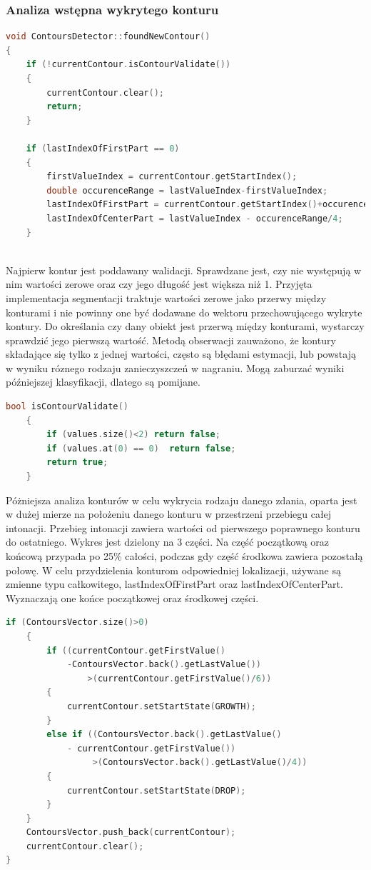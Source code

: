\documentclass[a4paper,12 pt]{article}
\begin{document}
\subsubsection{Analiza wstępna wykrytego konturu}
\begin{lstlisting}[caption={Funkcja zajmująca się analizą wstępną wykrytego konturu},label={lst:label},language=C++]
void ContoursDetector::foundNewContour()
{
    if (!currentContour.isContourValidate())
    {
        currentContour.clear();
        return;
    }
    
    if (lastIndexOfFirstPart == 0)
    {
        firstValueIndex = currentContour.getStartIndex();
        double occurenceRange = lastValueIndex-firstValueIndex;
        lastIndexOfFirstPart = currentContour.getStartIndex()+occurenceRange/4;
        lastIndexOfCenterPart = lastValueIndex - occurenceRange/4;
    }
                
\end{lstlisting}
Najpierw kontur jest poddawany walidacji. Sprawdzane jest, czy nie występują w nim wartości zerowe oraz czy jego długość jest większa niż 1. Przyjęta implementacja segmentacji traktuje wartości zerowe jako przerwy między konturami i nie powinny one być dodawane do wektoru przechowującego wykryte kontury. Do określania czy dany obiekt jest przerwą między konturami, wystarczy sprawdzić jego pierwszą wartość.
Metodą obserwacji zauważono, że kontury składające się tylko z jednej wartości, często są błędami estymacji, lub powstają w wyniku róznego rodzaju zanieczyszczeń w nagraniu. Mogą zaburzać wyniki późniejszej klasyfikacji, dlatego są pomijane.
\begin{lstlisting}[caption={Funkcja dokonująca walidacji konturu},label={lst:label},language=C++]
    bool isContourValidate()
    {
        if (values.size()<2) return false;
        if (values.at(0) == 0)  return false;
        return true;
    }
\end{lstlisting}
Póżniejsza analiza konturów w celu wykrycia rodzaju danego zdania, oparta jest w dużej mierze na położeniu danego konturu w przestrzeni przebiegu całej intonacji. Przebieg intonacji zawiera wartości od pierwszego poprawnego konturu do ostatniego. Wykres jest dzielony na 3 części. Na część początkową oraz końcową przypada po 25\% całości, podczas gdy część środkowa zawiera pozostałą połowę.
W celu przydzielenia konturom odpowiedniej lokalizacji, używane są zmienne typu całkowitego, lastIndexOfFirstPart oraz lastIndexOfCenterPart. Wyznaczają one końce początkowej oraz środkowej części.
\begin{lstlisting}[caption={Dalsza część funkcji foundNewContour},label={lst:label},language=C++]
     if (ContoursVector.size()>0)
    {
        if ((currentContour.getFirstValue()
        	-ContoursVector.back().getLastValue())
                >(currentContour.getFirstValue()/6))
        {
            currentContour.setStartState(GROWTH);
        }
        else if ((ContoursVector.back().getLastValue() 
        	- currentContour.getFirstValue())
                 >(ContoursVector.back().getLastValue()/4))
        {
            currentContour.setStartState(DROP);
        }
    }
    ContoursVector.push_back(currentContour);
    currentContour.clear();
}
\end{lstlisting}
\end{document}
